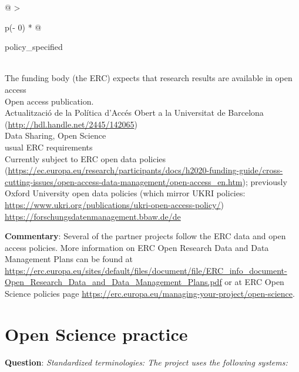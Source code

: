 \documentclass[
  12pt,
]{scrreprt}
\begin{document}
\begin{longtable}[]{@{}
  >{\raggedright\arraybackslash}p{(\columnwidth - 0\tabcolsep) * }@{}}
\toprule
\begin{minipage}[b]{\linewidth}\raggedright
policy\_specified
\end{minipage} \\
\midrule
\endhead
The funding body (the ERC) expects that research results are available
in open access \\
Open access publication. \\
Actualització de la Política d'Accés Obert a la Universitat de Barcelona
(\url{http://hdl.handle.net/2445/142065}) \\
Data Sharing, Open Science \\
usual ERC requirements \\
Currently subject to ERC open data policies
(\url{https://ec.europa.eu/research/participants/docs/h2020-funding-guide/cross-cutting-issues/open-access-data-management/open-access_en.htm});
previously Oxford University open data policies (which mirror UKRI
policies:
\url{https://www.ukri.org/publications/ukri-open-access-policy/}) \\
\url{https://forschungsdatenmanagement.bbaw.de/de} \\
\bottomrule
\end{longtable}

\normalsize

\textbf{Commentary}: Several of the partner projects follow the ERC data
and open access policies. More information on ERC Open Research Data and
Data Management Plans can be found at
\url{https://erc.europa.eu/sites/default/files/document/file/ERC_info_document-Open_Research_Data_and_Data_Management_Plans.pdf}
or at ERC Open Science policies page
\url{https://erc.europa.eu/managing-your-project/open-science}.

\hypertarget{open-science-practice}{%
\section{Open Science practice}\label{open-science-practice}}

\textbf{Question}: \emph{Standardized terminologies: The project uses
the following systems:}

\footnotesize
\end{document}
